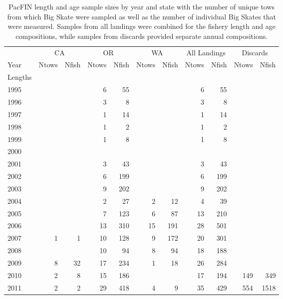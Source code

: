 \documentclass[12pt,]{article}
\begin{document}
\begin{table}[ht]
\centering
\caption{PacFIN length and age sample sizes by year and state with the number of unique tows from which Big Skate were sampled as well as the number of individual Big Skates that were measured. Samples from all landings were combined for the fishery length and age compositions, while samples from discards provided separate annual compositions.} 
\label{tab:PacFIN_Samples}
\begin{tabular}{lrrrrrrrrrr}
  \hline
   \multicolumn{1}{c}{} & \multicolumn{2}{c}{CA} & \multicolumn{2}{c}{OR} & \multicolumn{2}{c}{WA} & \multicolumn{2}{c}{All Landings} & \multicolumn{2}{c}{Discards} \\  \cmidrule(lr){2-3} \cmidrule(lr){4-5} \cmidrule(lr){6-7} \cmidrule(lr){8-9} \cmidrule(lr){10-11}
  Year & Ntows & Nfish & Ntows & Nfish & Ntows & Nfish & Ntows & Nfish & Ntows & Nfish \\ 
  \hline
Lengths &  &  &  &  &  &  &  &  &  &  \\ 
  1995 &  &  &   6 &  55 &  &  &   6 &  55 &  &  \\ 
  1996 &  &  &   3 &   8 &  &  &   3 &   8 &  &  \\ 
  1997 &  &  &   1 &  14 &  &  &   1 &  14 &  &  \\ 
  1998 &  &  &   1 &   2 &  &  &   1 &   2 &  &  \\ 
  1999 &  &  &   1 &   8 &  &  &   1 &   8 &  &  \\ 
  2000 &  &  &  &  &  &  &  &  &  &  \\ 
  2001 &  &  &   3 &  43 &  &  &   3 &  43 &  &  \\ 
  2002 &  &  &   6 & 199 &  &  &   6 & 199 &  &  \\ 
  2003 &  &  &   9 & 202 &  &  &   9 & 202 &  &  \\ 
  2004 &  &  &   2 &  27 &   2 &  12 &   4 &  39 &  &  \\ 
  2005 &  &  &   7 & 123 &   6 &  87 &  13 & 210 &  &  \\ 
  2006 &  &  &  13 & 310 &  15 & 191 &  28 & 501 &  &  \\ 
  2007 &   1 &   1 &  10 & 128 &   9 & 172 &  20 & 301 &  &  \\ 
  2008 &  &  &  10 &  94 &   8 &  94 &  18 & 188 &  &  \\ 
  2009 &   8 &  32 &  17 & 234 &   1 &  18 &  26 & 284 &  &  \\ 
  2010 &   2 &   8 &  15 & 186 &  &  &  17 & 194 & 149 & 349 \\ 
  2011 &   2 &   2 &  29 & 418 &   4 &   9 &  35 & 429 & 554 & 1518 \\ 

\end{tabular}
\end{table}
\end{document}

